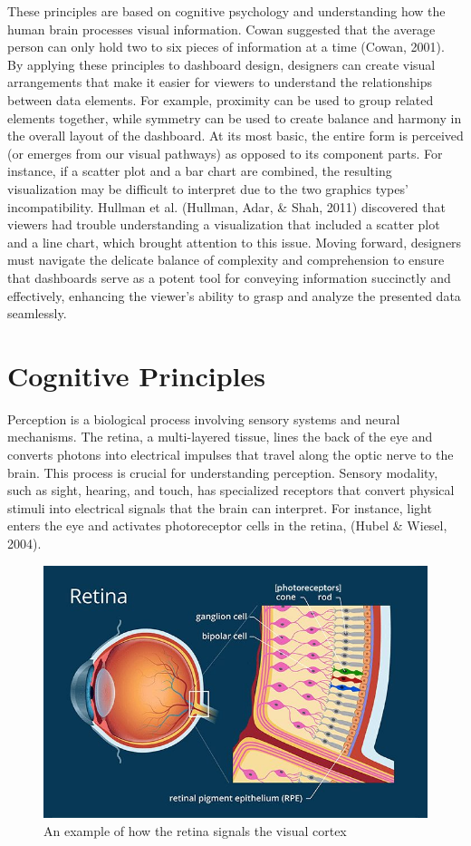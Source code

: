 \documentclass[print]{nuthesis}
\begin{document}
These principles are based on cognitive psychology and understanding how the human brain processes visual information.
Cowan suggested that the average person can only hold two to six pieces of information at a time (Cowan, 2001).
By applying these principles to dashboard design, designers can create visual arrangements that make it easier for viewers to understand the relationships between data elements.
For example, proximity can be used to group related elements together, while symmetry can be used to create balance and harmony in the overall layout of the dashboard.
At its most basic, the entire form is perceived (or emerges from our visual pathways) as opposed to its component parts.
For instance, if a scatter plot and a bar chart are combined, the resulting visualization may be difficult to interpret due to the two graphics types' incompatibility.
Hullman et al. (Hullman, Adar, \& Shah, 2011) discovered that viewers had trouble understanding a visualization that included a scatter plot and a line chart, which brought attention to this issue.
Moving forward, designers must navigate the delicate balance of complexity and comprehension to ensure that dashboards serve as a potent tool for conveying information succinctly and effectively, enhancing the viewer's ability to grasp and analyze the presented data seamlessly.

\hypertarget{cognitive-principles}{%
\section{Cognitive Principles}\label{cognitive-principles}}

Perception is a biological process involving sensory systems and neural mechanisms.
The retina, a multi-layered tissue, lines the back of the eye and converts photons into electrical impulses that travel along the optic nerve to the brain.
This process is crucial for understanding perception.
Sensory modality, such as sight, hearing, and touch, has specialized receptors that convert physical stimuli into electrical signals that the brain can interpret.
For instance, light enters the eye and activates photoreceptor cells in the retina, (Hubel \& Wiesel, 2004).

\begin{figure}

{\centering \includegraphics[width=0.55\linewidth]{figure/photoreceptors_image} 

}

\caption{An example of how the retina signals the visual cortex}\label{fig:unnamed-chunk-3}
\end{figure}
\end{document}
